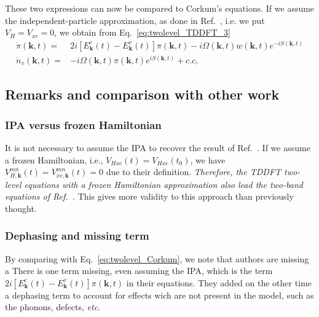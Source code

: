 \documentclass[a4paper,11pt]{report}
\renewcommand{\vec}[1]{\mathbf{#1}}
\begin{document}
These two expressions can now be compared to Corkum's equations.
If we assume the independent-particle approximation, as done in Ref.~\cite{PhysRevLett.113.073901}, i.e. we put $V_{H}=V_{xc}=0$, we obtain from Eq.~\ref{eq:twolevel_TDDFT_3} 
\begin{subequations}
 \begin{align}
  \dot{\pi}(\vec{k},t) =& 2i[E_\vec{k}^c(t)-E_\vec{k}^v(t)]\pi(\vec{k},t)  - i \Omega(\vec{k},t)w(\vec{k},t)e^{-iS(\vec{k},t)} \\
   \dot{n}_v(\vec{k},t) =& -i\Omega(\vec{k},t)\pi(\vec{k},t)e^{iS(\vec{k},t)} + c.c,
 \end{align}
 \label{eq:twolevel_TDDFT_4}
\end{subequations}

\subsection{Remarks and comparison with other work}

\subsubsection{IPA versus frozen Hamiltonian}
It is not necessary to assume the IPA to recover the result of Ref.~\cite{PhysRevLett.113.073901}. If we assume a frozen Hamiltonian, i.e., $V_{Hxc}(t)=V_{Hxc}(t_0)$, we have $V_{H,\vec{k}}^{mn}(t) = V_{xc,\vec{k}}^{mn}(t)=0$ due to their definition.
\emph{Therefore, the TDDFT two-level equations with a frozen Hamiltonian approximation also lead the two-band equations of Ref.~\cite{PhysRevLett.113.073901}.} This gives more validity to this approach than previously thought. \\

\subsubsection{Dephasing and missing term}

By comparing with Eq.~\ref{eq:twolevel_Corkum}, we note that authors are missing a 
There is one term missing, even assuming the IPA, which is the term $ 2i[E_\vec{k}^c(t)-E_\vec{k}^v(t)]\pi(\vec{k},t)$ in their equations.
They added on the other time a dephasing term to account for effects wich are not present in the model, such as the phonons, defects, \textit{etc}.


\end{document}
